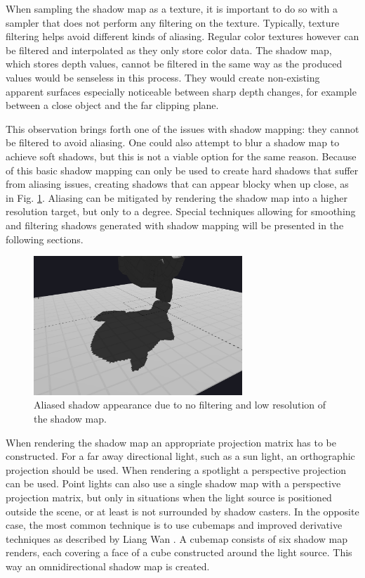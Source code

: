 When sampling the shadow map as a texture, it is important to do so with a sampler that does not perform any filtering on the texture. Typically, texture filtering helps avoid different kinds of aliasing. Regular color textures however can be filtered and interpolated as they only store color data. The shadow map, which stores depth values, cannot be filtered in the same way as the produced values would be senseless in this process. They would create non-existing apparent surfaces especially noticeable between sharp depth changes, for example between a close object and the far clipping plane.

This observation brings forth one of the issues with shadow mapping: they cannot be filtered to avoid aliasing. One could also attempt to blur a shadow map to achieve soft shadows, but this is not a viable option for the same reason. Because of this basic shadow mapping can only be used to create hard shadows that suffer from aliasing issues, creating shadows that can appear blocky when up close, as in Fig. \ref{fig:shadow_mapping_blocky}. Aliasing can be mitigated by rendering the shadow map into a higher resolution target, but only to a degree. Special techniques allowing for smoothing and filtering shadows generated with shadow mapping will be presented in the following sections.

\begin{figure}
    \centering
	\includegraphics[width=0.7\textwidth]{./graf/shadow_mapping_blocky.png}
	\caption{Aliased shadow appearance due to no filtering and low resolution of the shadow map.}
	\label{fig:shadow_mapping_blocky}
\end{figure}

When rendering the shadow map an appropriate projection matrix has to be constructed. For a far away directional light, such as a sun light, an orthographic projection should be used. When rendering a spotlight a perspective projection can be used. Point lights can also use a single shadow map with a perspective projection matrix, but only in situations when the light source is positioned outside the scene, or at least is not surrounded by shadow casters. In the opposite case, the most common technique is to use cubemaps and improved derivative techniques as described by Liang Wan \cite{bib:article:wan_cubemaps}. A cubemap consists of six shadow map renders, each covering a face of a cube constructed around the light source. This way an omnidirectional shadow map is created.

